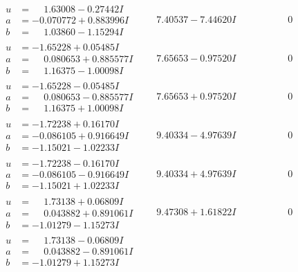 \documentclass[1p]{elsarticle_modified}
\theoremstyle{definition}
\begin{document}
$$\begin{array}{c|c|c}
\begin{aligned}
u &= \phantom{-}1.63008 - 0.27442 I \\
a &= -0.070772 + 0.883996 I \\
b &= \phantom{-}1.03860 - 1.15294 I\end{aligned}
 & \phantom{-}7.40537 - 7.44620 I & \phantom{-0.000000 } 0 \\ \hline\begin{aligned}
u &= -1.65228 + 0.05485 I \\
a &= \phantom{-}0.080653 + 0.885577 I \\
b &= \phantom{-}1.16375 - 1.00098 I\end{aligned}
 & \phantom{-}7.65653 - 0.97520 I & \phantom{-0.000000 } 0 \\ \hline\begin{aligned}
u &= -1.65228 - 0.05485 I \\
a &= \phantom{-}0.080653 - 0.885577 I \\
b &= \phantom{-}1.16375 + 1.00098 I\end{aligned}
 & \phantom{-}7.65653 + 0.97520 I & \phantom{-0.000000 } 0 \\ \hline\begin{aligned}
u &= -1.72238 + 0.16170 I \\
a &= -0.086105 + 0.916649 I \\
b &= -1.15021 - 1.02233 I\end{aligned}
 & \phantom{-}9.40334 - 4.97639 I & \phantom{-0.000000 } 0 \\ \hline\begin{aligned}
u &= -1.72238 - 0.16170 I \\
a &= -0.086105 - 0.916649 I \\
b &= -1.15021 + 1.02233 I\end{aligned}
 & \phantom{-}9.40334 + 4.97639 I & \phantom{-0.000000 } 0 \\ \hline\begin{aligned}
u &= \phantom{-}1.73138 + 0.06809 I \\
a &= \phantom{-}0.043882 + 0.891061 I \\
b &= -1.01279 - 1.15273 I\end{aligned}
 & \phantom{-}9.47308 + 1.61822 I & \phantom{-0.000000 } 0 \\ \hline\begin{aligned}
u &= \phantom{-}1.73138 - 0.06809 I \\
a &= \phantom{-}0.043882 - 0.891061 I \\
b &= -1.01279 + 1.15273 I\end{aligned}

\end{array}$$
\end{document}

